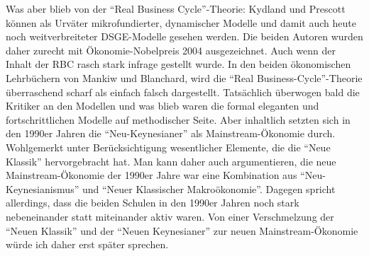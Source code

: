 Was aber blieb von der "`Real Business Cycle"'-Theorie: Kydland und Prescott können als Urväter mikrofundierter, dynamischer Modelle und damit auch heute noch weitverbreiteter DSGE-Modelle gesehen werden. Die beiden Autoren wurden daher zurecht mit Ökonomie-Nobelpreis 2004 ausgezeichnet.
Auch wenn der Inhalt der RBC rasch stark infrage gestellt wurde. In den beiden ökonomischen Lehrbüchern von Mankiw und Blanchard, wird die "`Real Business-Cycle"'-Theorie überraschend scharf als einfach falsch dargestellt. Tatsächlich überwogen bald die Kritiker an den Modellen und was blieb waren die formal eleganten und fortschrittlichen Modelle auf methodischer Seite. Aber inhaltlich setzten sich in den 1990er Jahren die "`Neu-Keynesianer"' als Mainstream-Ökonomie durch. Wohlgemerkt unter Berücksichtigung wesentlicher Elemente, die die "`Neue Klassik"' hervorgebracht hat. Man kann daher auch argumentieren, die neue Mainstream-Ökonomie der 1990er Jahre war eine Kombination aus "`Neu-Keynesianismus"' und "`Neuer Klassischer Makroökonomie"'. Dagegen spricht allerdings, dass die beiden Schulen in den 1990er Jahren noch stark nebeneinander statt miteinander aktiv waren.
Von einer Verschmelzung der "`Neuen Klassik"' und der "`Neuen Keynesianer"' zur neuen Mainstream-Ökonomie würde ich daher erst später sprechen.


